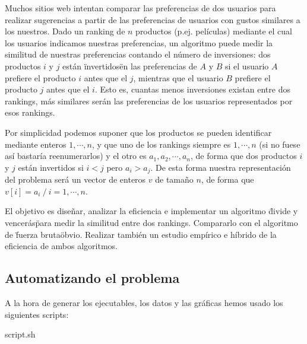 
Muchos sitios web intentan comparar las preferencias de dos usuarios para realizar sugerencias a partir de las preferencias de usuarios con gustos similares a los nuestros. Dado un ranking de $n$ productos (p.ej. pel\'iculas) mediante el cual los usuarios indicamos nuestras preferencias, un algoritmo puede medir la similitud de nuestras preferencias contando el n\'umero de inversiones: dos productos $i$ y $j$ est\'an \"invertidos\" en las preferencias de $A$ y $B$ si el usuario $A$ prefiere el producto $i$ antes que el $j$, mientras que el usuario $B$ prefiere el producto $j$ antes que el $i$. Esto es, cuantas menos inversiones existan entre dos rankings, m\'as similares ser\'an las
preferencias de los usuarios representados por esos rankings.

Por simplicidad podemos suponer que los productos se pueden identificar mediante enteros
$1, \cdots, n$, y que uno de los rankings siempre es $1,\cdots, n$ (si no fuese as\'i bastar\'ia reenumerarlos) y el otro es $a_1, a_2, \cdots, a_n$, de forma que dos productos $i$ y $j$ est\'an invertidos si $i < j$ pero $a_i > a_j$.
De esta forma nuestra representaci\'on del problema ser\'a un vector de enteros $v$ de tamaño $n$, de forma que $v[i] = a_i\ / \ i = 1, \cdots, n$.

El objetivo es diseñar, analizar la eficiencia e implementar un algoritmo \"divide y vencer\'as\" para medir la similitud entre dos rankings. Compararlo con el algoritmo de \"fuerza bruta\" obvio. Realizar tambi\'en un estudio emp\'irico e h\'ibrido de la eficiencia de ambos algoritmos.

\subsection{Automatizando el problema}
A la hora de generar los ejecutables, los datos y las gráficas hemos usado los siguientes scripts:

\begin{center}
	script.sh
\end{center}

